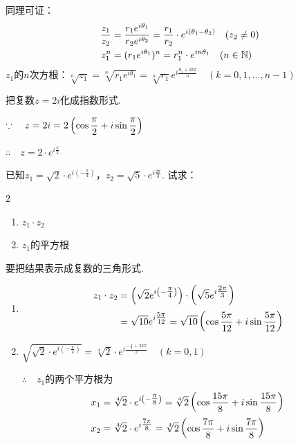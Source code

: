 同理可证：
\[\begin{split}
    \dfrac{z_1}{z_2}&=\dfrac{r_1e^{i\theta_1}}{r_2e^{i\theta_2}}=\dfrac{r_1}{r_2}\cdot e^{i(\theta_1-\theta_2)}\quad (z_2\ne 0)\\
z^n_1&=(r_1e^{i\theta_1})^n=r^n_1 \cdot e^{i n\theta_1}\quad (n\in\mathbb{N})
\end{split} \]
$z_1$的$n$次方根：$\sqrt[n]{z_1}=\sqrt[n]{r_1e^{i\theta_1}}=\sqrt[n]{r_1}e^{i\tfrac{\theta_1+2k\pi}{n}}\quad (k=0,1,\ldots,n-1)$

\begin{example}
把复数$z=2i$化成指数形式.
\end{example}

\begin{solution}
$\because\quad z=2i=2\left(\cos{\dfrac{\pi}{2}}+i\sin{\dfrac{\pi}{2}}\right)$

$\therefore\quad z=2\cdot e^{i\tfrac{\pi}{2}}$
\end{solution}

\begin{example}
已知$z_1=\sqrt{2}\cdot e^{i\left(-\tfrac{\pi}{4}\right)}$，$z_2=\sqrt{5}\cdot e^{i\tfrac{2\pi}{3}}$. 试求：
\begin{multicols}{2}
\begin{enumerate}[(1)]
    \item $z_1\cdot z_2$
    \item $z_1$的平方根
\end{enumerate}
\end{multicols}
要把结果表示成复数的三角形式.
\end{example}

\begin{solution}
\begin{enumerate}[(1)]
    \item \[\begin{split}
z_1\cdot z_2&=\left(\sqrt{2} e^{i\left(-\tfrac{\pi}{4}\right)}\right)\cdot \left(\sqrt{5} e^{i\tfrac{2\pi}{3}}\right)\\
&=\sqrt{10}e^{i\tfrac{5\pi}{12}}=\sqrt{10}\left(\cos{\dfrac{5\pi}{12}}+i\sin{\dfrac{5\pi}{12}}\right)
    \end{split}\]
\item $\sqrt{\sqrt{2}\cdot e^{i\left(-\tfrac{\pi}{4}\right)}}=\sqrt[4]{2}\cdot e^{i\tfrac{-\tfrac{\pi}{4}+2k\pi}{2}}\quad (k=0,1)$

$\therefore\quad z_1$的两个平方根为
\[\begin{split}
x_1&=\sqrt[4]{2}\cdot e^{i\left(-\tfrac{\pi}{8}\right)}=\sqrt[4]{2}\left(\cos{\dfrac{15\pi}{8}}+i\sin{\dfrac{15\pi}{8}}\right)\\
x_2&=\sqrt[4]{2}\cdot e^{i\tfrac{7\pi}{8}}=\sqrt[4]{2}\left(\cos{\dfrac{7\pi}{8}}+i\sin{\dfrac{7\pi}{8}}\right)
\end{split}\]
\end{enumerate}
\end{solution}




